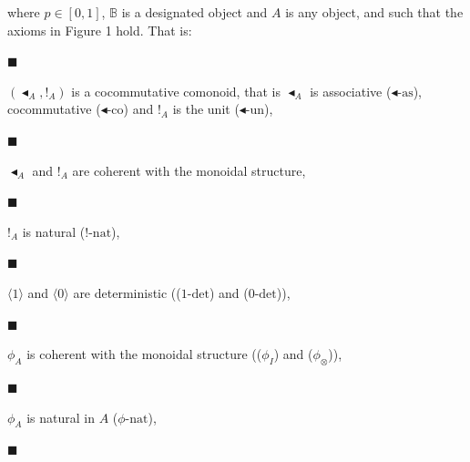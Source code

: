 \documentclass[10pt,a4paper]{article}
\begin{document}
where $p\in[0,1]$, $\mathbb{B}$ is a designated object and $A$ is any object, and such that the axioms in Figure 1 hold. That is:\par
  
\par\noindent  $\blacksquare$ 
 
$(\blacktriangleleft_{A},!_{A})$ is a cocommutative comonoid, that is $\blacktriangleleft_{A}$ is associative ($\blacktriangleleft\text{-as}$), cocommutative ($\blacktriangleleft\text{-co}$) and $!_{A}$ is the unit ($\blacktriangleleft\text{-un}$),\par
 
 
 
\par\noindent  $\blacksquare$ 
 
$\blacktriangleleft_{A}$ and $!_{A}$ are coherent with the monoidal structure,\par
 
 
 
\par\noindent  $\blacksquare$ 
 
$!_{A}$ is natural ($!\text{-nat}$),\par
 
 
 
\par\noindent  $\blacksquare$ 
 
$\langle 1\rangle$ and $\langle 0\rangle$ are deterministic (($1\text{-det}$) and ($0\text{-det}$)),\par
 
 
 
\par\noindent  $\blacksquare$ 
 
$\phi_{A}$ is coherent with the monoidal structure (($\phi_I$) and ($\phi_{\otimes}$)),\par
 
 
 
\par\noindent  $\blacksquare$ 
 
$\phi_{A}$ is natural in $A$ ($\phi\text{-nat}$),\par
 
 
 
\par\noindent  $\blacksquare$ 
 
\end{document}
